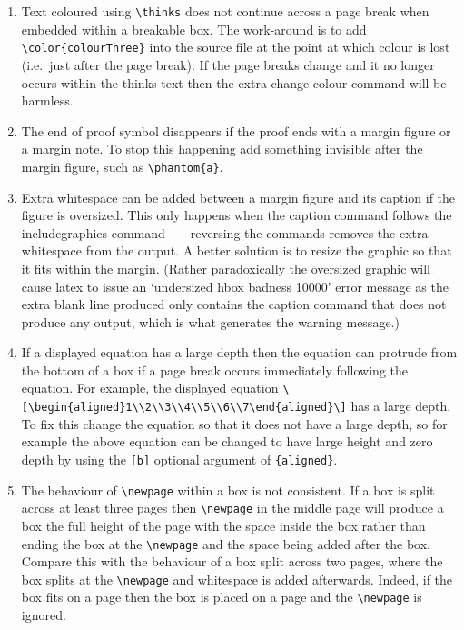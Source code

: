 \documentclass[solutionsatend,twocolumnsolutions]{ouunit}
\begin{document}
\begin{enumerate}[1.]
\item
Text coloured using \verb"\thinks" does not continue across a page break when embedded within a breakable box. The work-around is to add \verb"\color{colourThree}" into the source file at the point at which colour is lost (i.e.\ just after the page break). If the page breaks change and it no longer occurs within the thinks text then the extra change colour command will be harmless.
\item
The end of proof symbol disappears if the proof ends with a margin figure or a margin note. To stop this happening add something invisible after the margin figure, such as \verb"\phantom{a}".
\item
Extra whitespace can be added between a margin figure and its caption if the figure is oversized. This only happens when the caption command follows the includegraphics command ---- reversing the commands removes the extra whitespace from the output. A better solution is to resize the graphic so that it fits within the margin. (Rather paradoxically the oversized graphic will cause latex to issue an `undersized hbox badness 10000' error message as the extra blank line produced only contains the caption command that does not produce any output, which is what generates the warning message.)
\item
If a displayed equation has a large depth then the equation can protrude from the bottom of a box if a page break occurs immediately following the equation. For example, the displayed equation \verb"\[\begin{aligned}1\\2\\3\\4\\5\\6\\7\end{aligned}\]" has a large depth. To fix this change the equation so that it does not have a large depth, so for example the above equation can be changed to have large height and zero depth by using the \verb"[b]" optional argument of \verb"{aligned}".
\item
The behaviour of \verb"\newpage" within a box is not consistent.
If a box is split across at least three pages then \verb"\newpage" in the middle page will produce a box the full height of the page with the space inside the box rather than ending the box at the \verb"\newpage" and the space being added after the box. Compare this with the behaviour of a box split across two pages, where the box splits at the \verb"\newpage" and whitespace is added afterwards. Indeed, if the box fits on a page then the box is placed on a page and the \verb"\newpage" is ignored.
\end{enumerate}

\printexercisesolutions
\printactivitysolutions
\printindex
\end{document}
